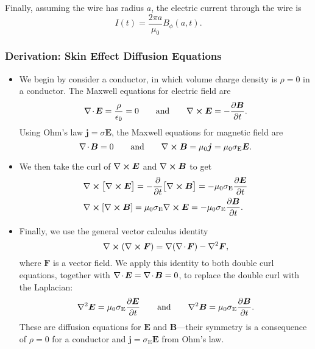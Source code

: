 \documentclass[11pt, a4paper]{article}
\newcommand{\eqtext}[1]{\qquad \text{#1} \qquad}
\renewcommand{\vec}[1]{\bm{#1}} %
\newcommand{\E}{\vec{E}} %
\newcommand{\B}{\vec{B}} %
\newcommand{\ee}{\epsilon_{0}}  %
\newcommand{\mm}{\mu_{0}}  %
\renewcommand{\j}{\vec{j}}  %
\renewcommand{\div}{\nabla \mspace{-2mu} \cdot \mspace{-2mu}}
\renewcommand{\curl}{\nabla \cross}
\renewcommand{\grad}{\nabla}
\renewcommand{\laplacian}{\nabla^{2}}
\begin{document}
\begin{itemize}
    Finally, assuming the wire has radius $ a $, the electric current through the wire is
    \begin{equation*}
        I(t) = \frac{2\pi a}{\mm}B_{\phi}(a, t).
    \end{equation*}
    
    
\end{itemize}

\subsubsection{Derivation: Skin Effect Diffusion Equations}
\begin{itemize} 

    \item We begin by consider a conductor, in which volume charge density is $ \rho = 0 $ in a conductor. The Maxwell equations for electric field are
	\begin{equation*}
		\div \E = \frac{\rho}{\ee} = 0 \eqtext{and} \curl \E = - \pdv{\B}{t}.
	\end{equation*}
    Using Ohm's law $ \j = \sigma \E $, the Maxwell equations for magnetic field are
	\begin{equation*}
		\div \B = 0 \eqtext{and} \curl \B = \mu_{0}\j = \mm \sigma_{\text{E}} \E.
	\end{equation*}

    \item We then take the curl of $ \curl \E $ and $ \curl \B $  to get
	\begin{align*}
        & \curl \big[ \curl \E \big] = - \pdv{t}\big[ \curl \B\big] = - \mm \sigma_{\text{E}} \pdv{\E}{t}\\
        & \curl [\curl \B] = \mm \sigma_{\text{E}}\curl \E = - \mm \sigma_{\text{E}}\pdv{\B}{t}.
	\end{align*}
	
	\item Finally, we use the general vector calculus identity
	\begin{equation*}
		\curl (\curl \vec{F}) = \grad (\div \vec{F}) - \laplacian \vec{F},
	\end{equation*}
    where $ \vec{F} $ is a vector field. We apply this identity to both double curl equations, together with $ \div \E = \div \B = 0 $, to replace the double curl with the Laplacian:
	\begin{equation*}
		\laplacian \E = \mm \sigma_{\text{E}}\pdv{\E}{t} \eqtext{and} \laplacian \B = \mm \sigma_{\text{E}} \pdv{\B}{t}.
	\end{equation*}
	These are diffusion equations for $ \E $ and $ \B $---their symmetry is a consequence of $ \rho = 0 $ for a conductor and $ \j = \sigma_{\text{E}} \E $ from Ohm's law. 
	
\end{itemize}
\end{document}
